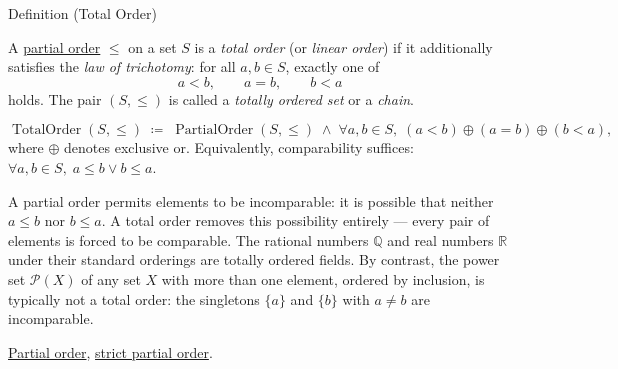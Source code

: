 \begin{definitionbox}{Definition (Total Order)}
\begin{definition}
\label{def:total-order}
A \hyperref[def:partial-order]{partial order} $\leq$ on a set $S$ is a
\emph{total order} (or \emph{linear order}) if it additionally satisfies
the \emph{law of trichotomy}: for all $a, b \in S$, exactly one of
\[
a < b, \qquad a = b, \qquad b < a
\]
holds.  The pair $(S, \leq)$ is called a \emph{totally ordered set}
or a \emph{chain}.
\end{definition}
\end{definitionbox}

\begin{remark*}
\[
\operatorname{TotalOrder}(S, \leq)
\;\coloneqq\;
\operatorname{PartialOrder}(S, \leq)
\;\land\;
\forall a, b \in S,\;
(a < b) \oplus (a = b) \oplus (b < a),
\]
where $\oplus$ denotes exclusive or.  Equivalently, comparability suffices:
$\forall a,b \in S,\; a \leq b \lor b \leq a$.
\end{remark*}

\begin{remark*}[Interpretation]
A partial order permits elements to be incomparable: it is possible that
neither $a \leq b$ nor $b \leq a$.  A total order removes this
possibility entirely — every pair of elements is forced to be comparable.
The rational numbers $\mathbb{Q}$ and real numbers $\mathbb{R}$ under their
standard orderings are totally ordered fields.  By contrast, the power
set $\mathcal{P}(X)$ of any set $X$ with more than one element, ordered
by inclusion, is typically not a total order: the singletons $\{a\}$ and
$\{b\}$ with $a \neq b$ are incomparable.
\end{remark*}

\begin{remark*}[Dependencies]
\hyperref[def:partial-order]{Partial order},
\hyperref[def:strict-partial-order]{strict partial order}.
\end{remark*}
